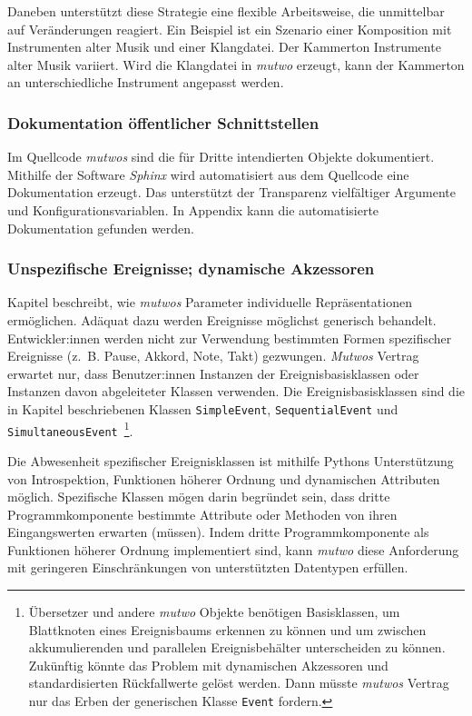 \documentclass[12pt,a4paper,ngerman]{article}
\begin{document}
Daneben unterstützt diese Strategie eine flexible Arbeitsweise, die unmittelbar auf Veränderungen reagiert.
Ein Beispiel ist ein Szenario einer Komposition mit Instrumenten alter Musik und einer Klangdatei.
Der Kammerton Instrumente alter Musik variiert.
Wird die Klangdatei in \emph{mutwo} erzeugt, kann der Kammerton an unterschiedliche Instrument angepasst werden.

\subsubsection{Dokumentation öffentlicher Schnittstellen}

Im Quellcode \emph{mutwos} sind die für Dritte intendierten Objekte dokumentiert.
Mithilfe der Software \emph{Sphinx} wird automatisiert aus dem Quellcode eine Dokumentation erzeugt.
Das unterstützt der Transparenz vielfältiger Argumente und Konfigurationsvariablen.
In Appendix kann die automatisierte Dokumentation gefunden werden.

\subsubsection{Unspezifische Ereignisse; dynamische Akzessoren}

Kapitel \emph{} beschreibt, wie \emph{mutwos} Parameter individuelle Repräsentationen ermöglichen.
Adäquat dazu werden Ereignisse möglichst generisch behandelt.
Entwickler:innen werden nicht zur Verwendung bestimmten Formen spezifischer Ereignisse (z.~B. Pause, Akkord, Note, Takt) gezwungen.
\emph{Mutwos} Vertrag erwartet nur, dass Benutzer:innen Instanzen der Ereignisbasisklassen oder Instanzen davon abgeleiteter Klassen verwenden.
Die Ereignisbasisklassen sind die in Kapitel \emph{} beschriebenen Klassen \texttt{SimpleEvent}, \texttt{SequentialEvent} und \texttt{SimultaneousEvent}~\footnote{%
    Übersetzer und andere \emph{mutwo} Objekte benötigen Basisklassen, um Blattknoten eines Ereignisbaums erkennen zu können und um zwischen akkumulierenden und parallelen Ereignisbehälter unterscheiden zu können.
    Zukünftig könnte das Problem mit dynamischen Akzessoren und standardisierten Rückfallwerte gelöst werden.
    Dann müsste \emph{mutwos} Vertrag nur das Erben der generischen Klasse \texttt{Event} fordern.
}.

\bigskip

Die Abwesenheit spezifischer Ereignisklassen ist mithilfe Pythons Unterstützung von Introspektion, Funktionen höherer Ordnung und dynamischen Attributen möglich.
Spezifische Klassen mögen darin begründet sein, dass dritte Programmkomponente bestimmte Attribute oder Methoden von ihren Eingangswerten erwarten (müssen).
Indem dritte Programmkomponente als Funktionen höherer Ordnung implementiert sind, kann \emph{mutwo} diese Anforderung mit geringeren Einschränkungen von unterstützten Datentypen erfüllen.
\end{document}
